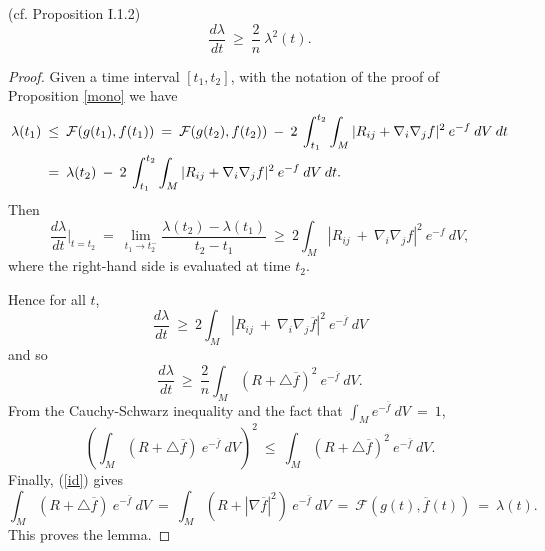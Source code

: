 \begin{lemma}
  \label{lem:kl-invariant-its-applications-differential-inequality-entropy}
 (cf. Proposition I.1.2) \label{2/3}
\begin{equation}
\frac{d\lambda}{dt} \: \ge \: \frac{2}{n} \: \lambda^2(t).
\end{equation}
\end{lemma}
\begin{proof}
Given a time interval $[t_1, t_2]$, with the notation of the proof of Proposition \ref{mono} we have
\begin{align}
\lambda(t_1) \: & \le \: {\mathcal F}(g(t_1), f(t_1)) \: = \:
{\mathcal F}(g(t_2), f(t_2)) \: - \: 2 \: \int_{t_1}^{t_2} \int_M |R_{ij} + \nabla_i \nabla_j f|^2 \:
e^{-f} \: dV \: dt \\
& = \: \lambda(t_2)  \: - \: 2 \: \int_{t_1}^{t_2} \int_M |R_{ij} + \nabla_i \nabla_j f|^2 \:
e^{-f} \: dV \: dt. \notag
\end{align}
Then
\begin{equation}
\frac{d\lambda}{dt} \Big|_{t=t_2}
\: = \: \lim_{t_1 \rightarrow t_2^-} \frac{\lambda(t_2) - \lambda(t_1)}{t_2 - t_1} \: \ge \:
2 \int_M |R_{ij} \: + \: \nabla_i \nabla_j {f}|^2 \: e^{- {f}}
\: dV,
\end{equation}
where the right-hand side is evaluated at time $t_2$.

Hence for all $t$,
\begin{equation} \label{dlambdadt}
\frac{d\lambda}{dt} \: \ge \:
2 \int_M |R_{ij} \: + \: \nabla_i \nabla_j \overline{f}|^2 \: e^{-\overline{f}}
\: dV
\end{equation}
and so
\begin{equation}
\frac{d\lambda}{dt} \: \ge \: \frac{2}{n} \int_M (R + \triangle \overline{f})^2 \:
e^{- \overline{f}} \: dV.
\end{equation}
From the Cauchy-Schwarz inequality and the fact that
$\int_M e^{- \overline{f}} \: dV \: = \: 1$,
\begin{equation}
\left( \int_M (R + \triangle \overline{f}) \: e^{- \overline{f}} \: dV \right)^2
\: \le \: \int_M (R + \triangle \overline{f})^2 \:
e^{- \overline{f}} \: dV.
\end{equation}
Finally, (\ref{id}) gives
\begin{equation} \label{using}
\int_M (R + \triangle \overline{f}) \: e^{- \overline{f}} \: dV \: = \:
\int_M (R + | \nabla \overline{f}|^2 ) \: e^{- \overline{f}} \: dV \: = \:
{\mathcal F}(g(t), \overline{f}(t)) \: = \: \lambda(t).
\end{equation}
This proves the lemma.
\end{proof}

